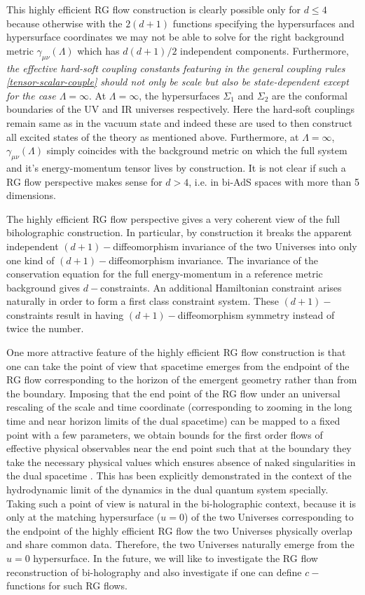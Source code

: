 \documentclass[prd,reprint,a4paper,showpacs,superscriptaddress,11pt,onecolumn,nofootinbib]{revtex4-1}
\renewcommand{\(}{\left(}
\renewcommand{\)}{\right)}
\newcommand{\6}{\partial}
\begin{document}
This highly efficient RG flow construction is clearly possible only for $d \leq 4$ because otherwise with the $2(d+1)$ functions specifying the hypersurfaces and hypersurface coordinates we may not be able to solve for the right background metric $\gamma_{\mu\nu}(\Lambda)$ which has $d(d+1)/2$ independent components. Furthermore, \textit{the effective hard-soft coupling constants featuring in the general coupling rules \eqref{tensor-scalar-couple} should not only be scale but also be state-dependent except for the case $\Lambda = \infty$}. At $\Lambda = \infty$, the hypersurfaces $\Sigma_1$ and $\Sigma_2$ are the conformal boundaries of the UV and IR universes respectively. Here the hard-soft couplings remain same as in the vacuum state and indeed these are used to then construct all excited states of the theory as mentioned above. Furthermore, at $\Lambda = \infty$, $\gamma_{\mu\nu}(\Lambda)$ simply coincides with the background metric on which the full system and it's energy-momentum tensor lives by construction. It is not clear if such a RG flow perspective makes sense for $d>4$, i.e. in bi-AdS spaces with more than 5 dimensions.

The highly efficient RG flow perspective gives a very coherent view of the full biholographic construction. In particular, by construction it breaks the apparent independent $(d+1)-$diffeomorphism invariance of the two Universes into only one kind of $(d+1)-$diffeomorphism invariance. The invariance of the conservation equation for the full energy-momentum in a reference metric background gives $d-$constraints. An additional Hamiltonian constraint arises naturally in order to form a first class constraint system. These $(d+1)-$constraints result in having $(d+1)-$diffeomorphism symmetry instead of twice the number.

One more attractive feature of the highly efficient RG flow construction is that one can take the point of view that spacetime emerges from the endpoint of the RG flow corresponding to the horizon of the emergent geometry rather than from the boundary. Imposing that the end point of the RG flow under an universal rescaling of the scale and time coordinate (corresponding to zooming in the long time and near horizon limits of the dual spacetime) can be mapped to a fixed point with a few parameters, we obtain bounds for the first order flows of effective physical observables near the end point such that at the boundary they take the necessary physical values which ensures absence of naked singularities in the dual spacetime \cite{Kuperstein:2013hqa,Behr:2015yna,Behr:2015aat}. This has been explicitly demonstrated in the context of the hydrodynamic limit of the dynamics in the dual quantum system specially. Taking such a point of view is natural in the bi-holographic context, because it is only at the matching hypersurface ($u=0$) of the two Universes corresponding to the endpoint of the highly efficient RG flow the two Universes physically overlap and share common data. Therefore, the two Universes naturally emerge from the $u=0$ hypersurface. In the future, we will like to investigate the RG flow reconstruction of bi-holography and also investigate if one can define $c-$functions for such RG flows.
\end{document}
